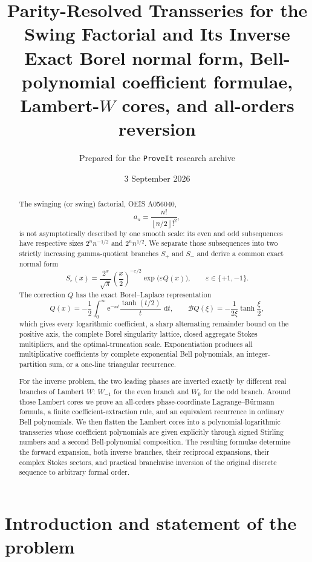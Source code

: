 \documentclass[11pt]{article}
\title{\textbf{Parity-Resolved Transseries for the Swing Factorial and Its Inverse}\\[0.45em]
\large Exact Borel normal form, Bell-polynomial coefficient formulae, Lambert-$W$ cores, and all-orders reversion}
\author{Prepared for the \texttt{ProveIt} research archive}
\date{3 September 2026}
\theoremstyle{definition}
\theoremstyle{remark}
\newcommand{\eps}{\varepsilon}
\newcommand{\dd}{\,\mathrm d}
\newcommand{\e}{\mathrm e}
\newcommand{\Borel}{\mathcal B}
\newcommand{\floor}[1]{\left\lfloor #1\right\rfloor}
\begin{document}
\maketitle

\begin{abstract}
The swinging (or swing) factorial, OEIS A056040,
\[
 a_n=\frac{n!}{\floor{n/2}!^2},
\]
is not asymptotically described by one smooth scale: its even and odd subsequences have respective sizes $2^n n^{-1/2}$ and $2^n n^{1/2}$.  We separate those subsequences into two strictly increasing gamma-quotient branches $S_+$ and $S_-$ and derive a common exact normal form
\[
 S_\eps(x)=\frac{2^x}{\sqrt\pi}\left(\frac{x}{2}\right)^{-\eps/2}\exp\!\bigl(\eps Q(x)\bigr),
 \qquad \eps\in\{+1,-1\}.
\]
The correction $Q$ has the exact Borel--Laplace representation
\[
 Q(x)=-\frac12\int_0^\infty \e^{-xt}\frac{\tanh(t/2)}{t}\,\dd t,
 \qquad
 \Borel Q(\xi)=-\frac{1}{2\xi}\tanh\!\frac{\xi}{2},
\]
which gives every logarithmic coefficient, a sharp alternating remainder bound on the positive axis, the complete Borel singularity lattice, closed aggregate Stokes multipliers, and the optimal-truncation scale.  Exponentiation produces all multiplicative coefficients by complete exponential Bell polynomials, an integer-partition sum, or a one-line triangular recurrence.

For the inverse problem, the two leading phases are inverted exactly by different real branches of Lambert $W$: $W_{-1}$ for the even branch and $W_0$ for the odd branch.  Around those Lambert cores we prove an all-orders phase-coordinate Lagrange--B\"urmann formula, a finite coefficient-extraction rule, and an equivalent recurrence in ordinary Bell polynomials.  We then flatten the Lambert cores into a polynomial-logarithmic transseries whose coefficient polynomials are given explicitly through signed Stirling numbers and a second Bell-polynomial composition.  The resulting formulae determine the forward expansion, both inverse branches, their reciprocal expansions, their complex Stokes sectors, and practical branchwise inversion of the original discrete sequence to arbitrary formal order.
\end{abstract}

\tableofcontents
\vspace{1em}

\section{Introduction and statement of the problem}
\end{document}
